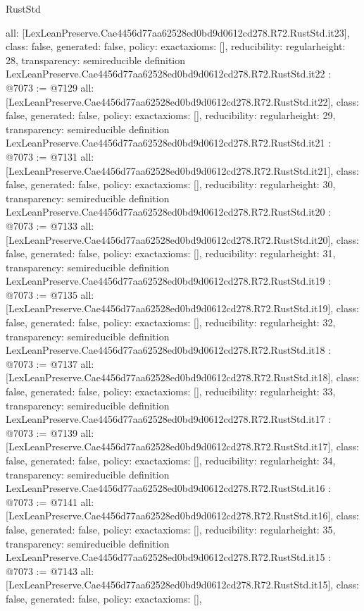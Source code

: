 \begin{lexlean}{RustStd}
\begin{coremodule}
{  all: [LexLeanPreserve.Cae4456d77aa62528ed0bd9d0612cd278.R72.RustStd.it23],
  class: false,
  generated: false,
  policy: exact{axioms: []},
  reducibility: regular{height: 28},
  transparency: semireducible
}
definition LexLeanPreserve.Cae4456d77aa62528ed0bd9d0612cd278.R72.RustStd.it22 : @7073 := @7129 {
  all: [LexLeanPreserve.Cae4456d77aa62528ed0bd9d0612cd278.R72.RustStd.it22],
  class: false,
  generated: false,
  policy: exact{axioms: []},
  reducibility: regular{height: 29},
  transparency: semireducible
}
definition LexLeanPreserve.Cae4456d77aa62528ed0bd9d0612cd278.R72.RustStd.it21 : @7073 := @7131 {
  all: [LexLeanPreserve.Cae4456d77aa62528ed0bd9d0612cd278.R72.RustStd.it21],
  class: false,
  generated: false,
  policy: exact{axioms: []},
  reducibility: regular{height: 30},
  transparency: semireducible
}
definition LexLeanPreserve.Cae4456d77aa62528ed0bd9d0612cd278.R72.RustStd.it20 : @7073 := @7133 {
  all: [LexLeanPreserve.Cae4456d77aa62528ed0bd9d0612cd278.R72.RustStd.it20],
  class: false,
  generated: false,
  policy: exact{axioms: []},
  reducibility: regular{height: 31},
  transparency: semireducible
}
definition LexLeanPreserve.Cae4456d77aa62528ed0bd9d0612cd278.R72.RustStd.it19 : @7073 := @7135 {
  all: [LexLeanPreserve.Cae4456d77aa62528ed0bd9d0612cd278.R72.RustStd.it19],
  class: false,
  generated: false,
  policy: exact{axioms: []},
  reducibility: regular{height: 32},
  transparency: semireducible
}
definition LexLeanPreserve.Cae4456d77aa62528ed0bd9d0612cd278.R72.RustStd.it18 : @7073 := @7137 {
  all: [LexLeanPreserve.Cae4456d77aa62528ed0bd9d0612cd278.R72.RustStd.it18],
  class: false,
  generated: false,
  policy: exact{axioms: []},
  reducibility: regular{height: 33},
  transparency: semireducible
}
definition LexLeanPreserve.Cae4456d77aa62528ed0bd9d0612cd278.R72.RustStd.it17 : @7073 := @7139 {
  all: [LexLeanPreserve.Cae4456d77aa62528ed0bd9d0612cd278.R72.RustStd.it17],
  class: false,
  generated: false,
  policy: exact{axioms: []},
  reducibility: regular{height: 34},
  transparency: semireducible
}
definition LexLeanPreserve.Cae4456d77aa62528ed0bd9d0612cd278.R72.RustStd.it16 : @7073 := @7141 {
  all: [LexLeanPreserve.Cae4456d77aa62528ed0bd9d0612cd278.R72.RustStd.it16],
  class: false,
  generated: false,
  policy: exact{axioms: []},
  reducibility: regular{height: 35},
  transparency: semireducible
}
definition LexLeanPreserve.Cae4456d77aa62528ed0bd9d0612cd278.R72.RustStd.it15 : @7073 := @7143 {
  all: [LexLeanPreserve.Cae4456d77aa62528ed0bd9d0612cd278.R72.RustStd.it15],
  class: false,
  generated: false,
  policy: exact{axioms: []},
}
\end{coremodule}
\end{lexlean}

